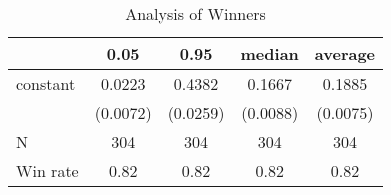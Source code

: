 \begin{table}
\caption{Analysis of Winners}
\begin{center}
\begin{tabular}{lcccc}
\hline
         &   0.05   &   0.95   &  median  & average   \\
\midrule
\midrule
constant & 0.0223   & 0.4382   & 0.1667   & 0.1885    \\
         & (0.0072) & (0.0259) & (0.0088) & (0.0075)  \\
N        & 304      & 304      & 304      & 304       \\
Win rate & 0.82     & 0.82     & 0.82     & 0.82      \\
\hline
\end{tabular}
\end{center}
\end{table}